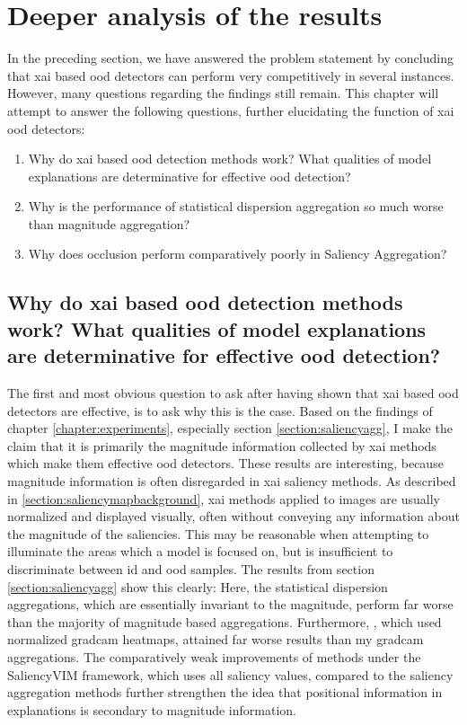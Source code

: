 \documentclass[UKenglish]{uiomasterthesis} %
\theoremstyle{definition}
\begin{document}
\section{Deeper analysis of the results}

In the preceding section, we have answered the problem statement by concluding that \ac{xai} based \ac{ood} detectors can perform very competitively in several instances. However, many questions regarding the findings still remain. This chapter will attempt to answer the following questions, further elucidating the function of \ac{xai} \ac{ood} detectors:

\begin{enumerate}
    \item Why do \ac{xai} based \ac{ood} detection methods work? What qualities of model explanations are determinative for effective \ac{ood} detection?
    \item Why is the performance of statistical dispersion aggregation so much worse than magnitude aggregation?
    \item Why does occlusion perform comparatively poorly in Saliency Aggregation?
\end{enumerate}

\subsection{Why do \ac{xai} based \ac{ood} detection methods work? What qualities of model explanations are determinative for effective \ac{ood} detection?}

The first and most obvious question to ask after having shown that \ac{xai} based \ac{ood} detectors are effective, is to ask why this is the case. Based on the findings of chapter \ref{chapter:experiments}, especially section \ref{section:saliencyagg}, I make the claim that it is primarily the magnitude information collected by \ac{xai} methods which make them effective \ac{ood} detectors. These results are interesting, because magnitude information is often disregarded in \ac{xai} saliency methods. As described in \ref{section:saliencymapbackground}, \ac{xai} methods applied to images are usually normalized and displayed visually, often without conveying any information about the magnitude of the saliencies. This may be reasonable when attempting to illuminate the areas which a model is focused on, but is insufficient to discriminate between \ac{id} and \ac{ood} samples. The results from section \ref{section:saliencyagg} show this clearly: Here, the statistical dispersion aggregations, which are essentially invariant to the magnitude, perform far worse than the majority of magnitude based aggregations. Furthermore, \cite{martinez}, which used normalized \ac{gradcam} heatmaps, attained far worse results than my \ac{gradcam} aggregations. The comparatively weak improvements of methods under the SaliencyVIM framework, which uses all saliency values, compared to the saliency aggregation methods further strengthen the idea that positional information in explanations is secondary to magnitude information.
\end{document}
